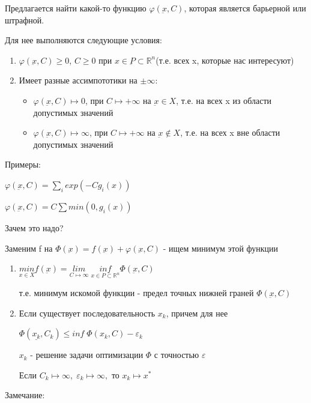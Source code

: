 \documentclass[a4paper, 12pt]{article}
\renewcommand{\phi}{\varphi} %
\renewcommand{\epsilon}{\varepsilon}
\begin{document}
	Предлагается найти какой-то функцию $\phi (\underbar{x}, C)$, которая является барьерной или штрафной.
	
	Для нее выполняются следующие условия:
	
	\begin{enumerate}
		\item $\phi (\underbar{x}, C) \geq 0$, $C\geq 0$ при $x \in \underbar{P} \subset 
		\mathbb {R}^n$(т.е. всех x, которые нас интересуют)
		\item Имеет разные ассимпототики на $\pm \infty$:
		\begin{itemize}
			\item $\phi (\underbar{x}, C) \mapsto 0$, при $C \mapsto +\infty$ на $\underbar{x} \in  X$, т.е. на всех x из области допустимых значений  
			\item $\phi (\underbar{x}, C) \mapsto \infty$, при $C \mapsto +\infty$ на $\underbar{x} \notin  X$, т.е. на всех x вне области допустимых значений 
		\end{itemize}
		
		
	\end{enumerate}
	
	Примеры: 
	
	$\phi (\underbar{x}, C) = \sum_i exp(-Cg_i(x))$
	
	$\phi (\underbar{x}, C) = C \sum min (0, g_i(x))$
	
	Зачем это надо? 
	
	Заменим f на  $\Phi(\underbar{x}) = f(\underbar{x}) + \phi (\underbar{x}, C) $ - ищем минимум этой функции
	
	
	\begin{enumerate}
		\item $\underset{x\in X}{min}f(\underbar{x}) = \underset{C \mapsto \infty}{lim} \; \underset{x \in {P} \subset 
			\mathbb {R}^n}{inf} \Phi(\underbar{x}, C)$   
		
		т.е. минимум искомой функции - предел точных нижней граней $\Phi(\underbar{x}, C)$
		\item Если существует последовательность $x_k$, причем для нее 
		
		$\Phi(\underline{x_k}, C_k) \leq inf \; \Phi({x}_k, C) - \epsilon_k$
		
		$x_k$ - решение задачи оптимизации $\Phi$ с точностью $\epsilon$
		
		Если $C_k \mapsto \infty, \; \epsilon_k \mapsto \infty,$ то $x_k \mapsto x^*$
	\end{enumerate}
	
	Замечание: 
	
\end{document}
